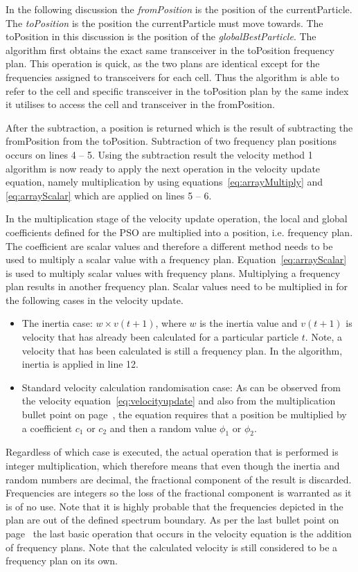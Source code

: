 In the following discussion the \emph{fromPosition} is the position of the currentParticle. The \emph{toPosition} is the position the currentParticle must move towards. The toPosition in this discussion is the position of the \emph{globalBestParticle}.
The algorithm first obtains the exact same transceiver in the toPosition frequency plan. This operation is quick, as the two plans are identical except for the frequencies assigned to transceivers for each cell. Thus the algorithm is able to refer to the cell and specific transceiver in the toPosition plan by the same index it utilises to access the cell and transceiver in the fromPosition.

After the subtraction, a position is returned which is the result of subtracting the fromPosition from the toPosition. Subtraction of two frequency plan positions occurs on lines 4 -- 5. Using the subtraction result the velocity method 1 algorithm is now ready to apply the next operation in the velocity update equation, namely multiplication by using equations~\ref{eq:arrayMultiply} and \ref{eq:arrayScalar} which are applied on lines 5 -- 6.

In the multiplication stage of the velocity update operation, the local and global coefficients defined for the \gls{PSO} are multiplied into a position, i.e. frequency plan. The coefficient are scalar values and therefore a different method needs to be used to multiply a scalar value with a frequency plan. Equation~\ref{eq:arrayScalar} is used to multiply scalar values with frequency plans. Multiplying a frequency plan results in another frequency plan. Scalar values need to be multiplied in for the following cases in the velocity update.
\begin{itemize}
\item The inertia case: $w \times v(t+1)$, where $w$ is the inertia value and $v(t+1)$ is velocity that has already been calculated for a particular particle $t$. Note, a velocity that has been calculated is still a frequency plan. In the algorithm, inertia is applied in line 12.
\item Standard velocity calculation randomisation case: As can be observed from the velocity equation~\ref{eq:velocityupdate} and also from the multiplication bullet point on page~\pageref{lst:velocitybreakup}, the equation requires that a position be multiplied by a coefficient $c_1$ or $c_2$ and then a random value $\phi_1$ or $\phi_2$. 
\end{itemize}

Regardless of which case is executed, the actual operation that is performed is integer multiplication, which therefore means that even though the inertia and random numbers are decimal, the fractional component of the result is discarded. Frequencies are integers so the loss of the fractional component is warranted as it is of no use. Note that it is highly probable that the frequencies depicted in the plan are out of the defined spectrum boundary. As per the last bullet point on page~\pageref{lst:velocitybreakup} the last basic operation that occurs in the velocity equation is the addition of frequency plans. Note that the calculated velocity is still considered to be a frequency plan on its own.

